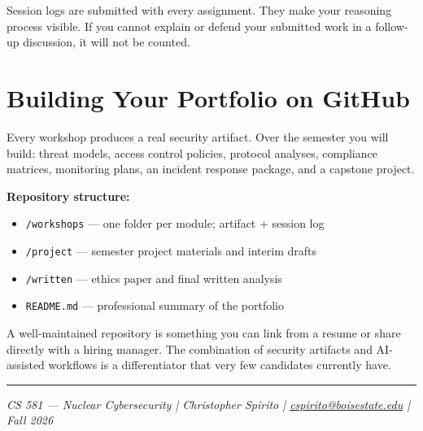 \documentclass[9pt]{extarticle}
\begin{document}
Session logs are submitted with every assignment. They make your reasoning
process visible. If you cannot explain or defend your submitted work in a
follow-up discussion, it will not be counted.

\section*{Building Your Portfolio on GitHub}

Every workshop produces a real security artifact. Over the semester you will
build: threat models, access control policies, protocol analyses, compliance
matrices, monitoring plans, an incident response package, and a capstone project.

\medskip

\textbf{Repository structure:}
\begin{itemize}
    \item \texttt{/workshops} --- one folder per module; artifact + session log
    \item \texttt{/project} --- semester project materials and interim drafts
    \item \texttt{/written} --- ethics paper and final written analysis
    \item \texttt{README.md} --- professional summary of the portfolio
\end{itemize}

A well-maintained repository is something you can link from a resume or share
directly with a hiring manager. The combination of security artifacts and
AI-assisted workflows is a differentiator that very few candidates currently have.

\vspace{8pt}
\hrule
\vspace{4pt}
{\small \textit{CS 581 --- Nuclear Cybersecurity \quad|\quad
Christopher Spirito \quad|\quad
\href{mailto:cspirito@boisestate.edu}{cspirito@boisestate.edu} \quad|\quad
Fall 2026}}
\end{document}
